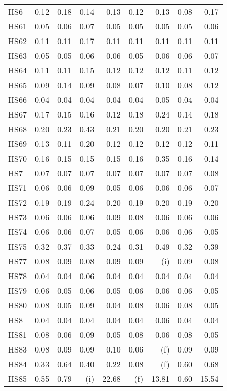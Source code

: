 \documentclass[11pt,twoside]{article}
\begin{document}
{\begin{longtable}[c]{|l|r|r|r|r|r|r|r|r|}
HS6 & 0.12 & 0.18 & 0.14 & 0.13 & 0.12 & 0.13 & 0.08 & 0.17 \\
HS61 & 0.05 & 0.06 & 0.07 & 0.05 & 0.05 & 0.05 & 0.05 & 0.06 \\
HS62 & 0.11 & 0.11 & 0.17 & 0.11 & 0.11 & 0.11 & 0.11 & 0.11 \\
HS63 & 0.05 & 0.05 & 0.06 & 0.06 & 0.05 & 0.06 & 0.06 & 0.07 \\
HS64 & 0.11 & 0.11 & 0.15 & 0.12 & 0.12 & 0.12 & 0.11 & 0.12 \\
HS65 & 0.09 & 0.14 & 0.09 & 0.08 & 0.07 & 0.10 & 0.08 & 0.12 \\
HS66 & 0.04 & 0.04 & 0.04 & 0.04 & 0.04 & 0.05 & 0.04 & 0.04 \\
HS67 & 0.17 & 0.15 & 0.16 & 0.12 & 0.18 & 0.24 & 0.14 & 0.18 \\
HS68 & 0.20 & 0.23 & 0.43 & 0.21 & 0.20 & 0.20 & 0.21 & 0.23 \\
HS69 & 0.13 & 0.11 & 0.20 & 0.12 & 0.12 & 0.12 & 0.12 & 0.11 \\
HS70 & 0.16 & 0.15 & 0.15 & 0.15 & 0.16 & 0.35 & 0.16 & 0.14 \\
HS7 & 0.07 & 0.07 & 0.07 & 0.07 & 0.07 & 0.07 & 0.07 & 0.08 \\
HS71 & 0.06 & 0.06 & 0.09 & 0.05 & 0.06 & 0.06 & 0.06 & 0.07 \\
HS72 & 0.19 & 0.19 & 0.24 & 0.20 & 0.19 & 0.20 & 0.19 & 0.20 \\
HS73 & 0.06 & 0.06 & 0.06 & 0.09 & 0.08 & 0.06 & 0.06 & 0.06 \\
HS74 & 0.06 & 0.06 & 0.07 & 0.05 & 0.06 & 0.06 & 0.06 & 0.05 \\
HS75 & 0.32 & 0.37 & 0.33 & 0.24 & 0.31 & 0.49 & 0.32 & 0.39 \\
HS77 & 0.08 & 0.09 & 0.08 & 0.09 & 0.09 & (i) & 0.09 & 0.08 \\
HS78 & 0.04 & 0.04 & 0.06 & 0.04 & 0.04 & 0.04 & 0.04 & 0.04 \\
HS79 & 0.06 & 0.05 & 0.06 & 0.05 & 0.06 & 0.06 & 0.06 & 0.05 \\
HS80 & 0.08 & 0.05 & 0.09 & 0.04 & 0.08 & 0.06 & 0.08 & 0.05 \\
HS8 & 0.04 & 0.04 & 0.04 & 0.04 & 0.04 & 0.06 & 0.04 & 0.04 \\
HS81 & 0.08 & 0.06 & 0.09 & 0.05 & 0.08 & 0.06 & 0.08 & 0.05 \\
HS83 & 0.08 & 0.09 & 0.09 & 0.10 & 0.06 & (f) & 0.09 & 0.09 \\
HS84 & 0.33 & 0.64 & 0.40 & 0.22 & 0.08 & (f) & 0.60 & 0.68 \\
HS85 & 0.55 & 0.79 & (i) & 22.68 & (f) & 13.81 & 0.60 & 15.54 \\

\end{longtable}}
\end{document}
